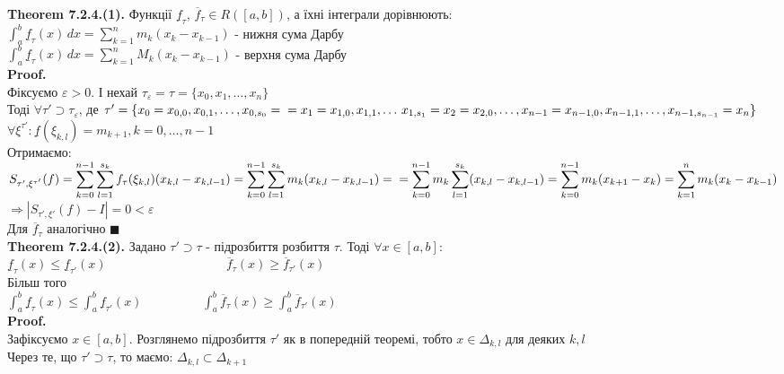 \documentclass[a4paper, 14pt]{extarticle}
\def\huge{\displaystyle}
\def\bigline{\vspace{5mm}\\}
\def\th#1{\textbf{Theorem {#1}}}
\def\proof{\textbf{Proof.}\\}
\def\bigline{\vspace{5mm}\\}
\def\qed{$\blacksquare$}
\begin{document}
\bigline
\th{7.2.4.(1).} Функції $\underline{f}_{\tau}$, $\overline{f}_{\tau} \in R([a,b])$, а їхні інтеграли дорівнюють:\\
$\huge \int_a^b \underline{f}_{\tau}(x)\,dx = \sum_{k=1}^n m_k(x_k-x_{k-1})$ - нижня сума Дарбу\\
$\huge \int_a^b \underline{f}_{\tau}(x)\,dx = \sum_{k=1}^n M_k(x_k-x_{k-1})$ - верхня сума Дарбу\\
\proof
Фіксуємо $\varepsilon > 0$. І нехай $\tau_{\varepsilon} = \tau = \{x_0,x_1,\dots,x_n\}$\\
Тоді $\forall \tau' \supset \tau_\varepsilon$, де $\\ \tau' = \{x_0 = x_{0,0}, x_{0,1}, \dots, x_{0,s_0} = \\ = x_1 = x_{1,0}, x_{1,1}, \dots\, x_{1,s_1} = x_2 = x_{2,0}, \dots, \\ x_{n-1} = x_{n-1,0}, x_{n-1,1}, \dots, x_{n-1, s_{n-1}} = x_n\}$\\
$\forall \xi^{\tau'}: \underline{f}(\xi_{k,l}) = m_{k+1}, k=0,\dots,n-1$\\
Отримаємо:\\
$S_{\tau', \xi^{\tau'}}(f) = \huge \sum_{k=0}^{n-1} \sum_{l=1}^{s_k} f_{\tau}(\xi_{k,l})(x_{k,l}-x_{k,l-1}) = \sum_{k=0}^{n-1} \sum_{l=1}^{s_k} m_k(x_{k,l}-x_{k,l-1}) = \\ = \sum_{k=0}^{n-1} m_k \sum_{l=1}^{s_k} (x_{k,l}-x_{k,l-1}) = \sum_{k=0}^{n-1} m_k(x_{k+1}-x_k) = \sum_{k=1}^n m_k(x_k-x_{k-1})$\\
$\Rightarrow |S_{\tau', \xi'}(f) - I| = 0 < \varepsilon$\\
Для $\overline{f}_{\tau}$ аналогічно \qed
\bigline
\th{7.2.4.(2).} Задано $\tau' \supset \tau$ - підрозбиття розбиття $\tau$. Тоді $\forall x \in [a,b]:$\\
$\underline{f}_{\tau}(x) \leq \underline{f}_{\tau'}(x) \hspace{4cm} \overline{f}_{\tau}(x) \geq \overline{f}_{\tau'}(x)$\\
Більш того\\
$\huge \int_a^b \underline{f}_{\tau}(x) \leq \int_a^b \underline{f}_{\tau'}(x) \hspace{2cm} \int_a^b \overline{f}_{\tau}(x) \geq \int_a^b \overline{f}_{\tau'}(x)$\\
\proof
Зафіксуємо $x \in [a,b]$. Розглянемо підрозбиття $\tau'$ як в попередній теоремі, тобто $x \in \Delta_{k,l}$ для деяких $k,l$\\
Через те, що $\tau' \supset \tau$, то маємо: $\Delta_{k,l} \subset \Delta_{k+1}$\\
\end{document}
